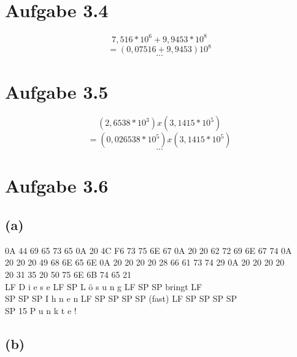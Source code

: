 \documentclass[12pt,a4paper]{article}
\begin{document}
\section*{Aufgabe 3.4}
\[7,516 * 10^6 + 9,9453 * 10^8\]
\[= (0,07516 + 9,9453) 10^8\]
\[...\]

\section*{Aufgabe 3.5}
\[(2,6538 * 10^3) x (3,1415 * 10^5)\]
\[= (0,026538 * 10^5) x (3,1415 * 10^5)\]
\[...\]

\section*{Aufgabe 3.6}
\subsection*{(a)}
0A 44 69 65 73 65 0A 20 4C F6 73 75 6E 67 0A 20 20 62 72 69 6E 67 74 0A \\
20 20 20 49 68 6E 65 6E 0A 20 20 20 20 28 66 61 73 74 29 0A 20 20 20 20 \\
20 31 35 20 50 75 6E 6B 74 65 21 \\
LF D i e s e LF SP L ö s u n g LF SP SP bringt LF \\
SP SP SP I h n e n LF SP SP SP SP (fast) LF SP SP SP SP \\
SP 15 P u n k t e !
\subsection*{(b)}
\end{document}
